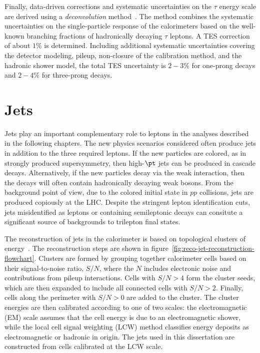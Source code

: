 Finally, data-driven corrections and systematic uncertainties on the $\tau$ energy scale are derived using a \emph{deconvolution} method~\cite{TheATLASCollaboration:2011ks}. The method combines the systematic uncertainties on the single-particle response of the calorimeters based on the well-known branching fractions of hadronically decaying $\tau$ leptons. A TES correction of about $1\%$ is determined. Including additional systematic uncertainties covering the detector modeling, pileup, non-closure of the calibration method, and the hadronic shower model, the total TES uncertainty is $2-3\%$ for one-prong decays and $2-4\%$ for three-prong decays.

\section{Jets}\label{sec:reco-jets}
Jets play an important complementary role to leptons in the analyses described in the following chapters. The new physics scenarios considered often produce jets in addition to the three required leptons. If the new particles are colored, as in strongly produced supersymmetry, then high-$\pt$ jets can be produced in cascade decays. Alternatively, if the new particles decay via the weak interaction, then the decays will often contain hadronically decaying weak bosons. From the background point of view, due to the colored initial state in $pp$ collisions, jets are produced copiously at the LHC. Despite the stringent lepton identification cuts, jets misidentified as leptons or containing semileptonic decays can consitute a significant source of backgrounds to trilepton final states.

The reconstruction of jets in the calorimeter is based on topological clusters of energy~\cite{TheATLASCollaboration:2011ks,TheATLASCollaboration:2015ds}. The reconstruction steps are shown in figure~\ref{fig:reco-jet-reconstruction-flowchart}. Clusters are formed by grouping together calorimeter cells based on their signal-to-noise ratio, $S/N$, where the $N$ includes electronic noise and contributions from pileup interactions. Cells with $S/N>4$ form the cluster seeds, which are then expanded to include all connected cells with $S/N>2$. Finally, cells along the perimeter with $S/N>0$ are added to the cluster. The cluster energies are then calibrated according to one of two scales: the electromagnetic (EM) scale assumes that the cell energy is due to an electromagnetic shower, while the local cell signal weighting (LCW) method classifies energy deposits as electromagnetic or hadronic in origin. The jets used in this dissertation are constructed from cells calibrated at the LCW scale.

